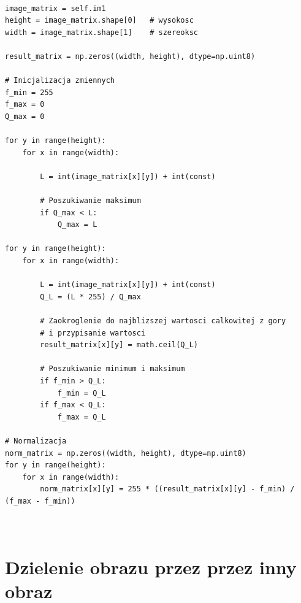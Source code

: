 \documentclass[final,a4paper,openany,12pt]{mwbk}
\begin{document}
\begin{lstlisting}[caption=Dzielenie obrazu szarego przez (zadaną) liczbę ]

image_matrix = self.im1
height = image_matrix.shape[0]   # wysokosc
width = image_matrix.shape[1]    # szereoksc

result_matrix = np.zeros((width, height), dtype=np.uint8)

# Inicjalizacja zmiennych
f_min = 255
f_max = 0
Q_max = 0

for y in range(height):
    for x in range(width):  

        L = int(image_matrix[x][y]) + int(const)

        # Poszukiwanie maksimum
        if Q_max < L:
            Q_max = L

for y in range(height):
    for x in range(width):  

        L = int(image_matrix[x][y]) + int(const)
        Q_L = (L * 255) / Q_max

        # Zaokroglenie do najblizszej wartosci calkowitej z gory
        # i przypisanie wartosci
        result_matrix[x][y] = math.ceil(Q_L)

        # Poszukiwanie minimum i maksimum
        if f_min > Q_L:
            f_min = Q_L
        if f_max < Q_L:
            f_max = Q_L

# Normalizacja
norm_matrix = np.zeros((width, height), dtype=np.uint8)
for y in range(height):
    for x in range(width):
        norm_matrix[x][y] = 255 * ((result_matrix[x][y] - f_min) / (f_max - f_min))
        
        
\end{lstlisting}

\section {Dzielenie obrazu przez przez inny obraz}

\hfill
\\\\
\indent
\end{document}
